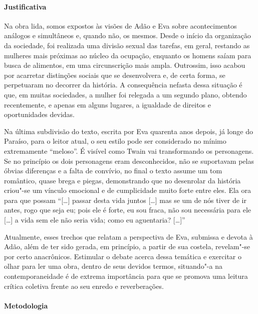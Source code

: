 \documentclass[12pt]{extarticle}
\begin{document}
\paragraph{Justificativa} Na obra lida, somos expostos às visões de Adão e Eva sobre
acontecimentos análogos e simultâneos e, quando não, os mesmos. Desde o
início da organização da sociedade, foi realizada uma divisão sexual das
tarefas, em geral, restando as mulheres mais próximas ao núcleo da
ocupação, enquanto os homens saíam para busca de alimentos, em uma
circunscrição mais ampla. Outrossim, isso acabou por acarretar
distinções sociais que se desenvolvera e, de certa forma, se perpetuaram
no decorrer da história. A consequência nefasta dessa situação é que, em
muitas sociedades, a mulher foi relegada a um segundo plano, obtendo
recentemente, e apenas em alguns lugares, a igualdade de direitos e
oportunidades devidas. 

Na última subdivisão do texto, escrita por Eva quarenta anos
depois, já longe do Paraíso, para o leitor atual, o seu estilo pode
ser considerado no mínimo extremamente ``meloso''. É visível como Twain vai
transformando os personagens. Se no princípio os dois personagens
eram desconhecidos, não se suportavam pelas óbvias
diferenças e a falta de convívio, no final o texto assume
um tom romântico, quase brega e piegas, demonstrando que
no desenrolar da história criou"-se um vínculo emocional e
de cumplicidade muito forte entre eles. 
Ela ora para que possam ``{[}\ldots{}{]} passar desta vida juntos {[}\ldots{}{]} mas se um de nós tiver
de ir antes, rogo que seja eu; pois ele é forte, eu sou fraca,
não sou necessária para ele {[}\ldots{}{]} a vida sem ele não seria vida;
como eu aguentaria? {[}\ldots{}{]}''

Atualmente, esses trechos que relatam a perspectiva de Eva, submissa e devota à Adão, além de ter sido 
gerada, em princípio, a partir de sua costela, revelam"-se por certo anacrônicos. 
Estimular o debate acerca dessa temática e exercitar o olhar para ler uma obra, dentro de seus devidos termos, 
situando"-a na contemporaneidade é de extrema importância para que se promova uma leitura crítica coletiva frente 
ao seu enredo e reverberações. 

\paragraph{Metodologia} 
\end{document}
